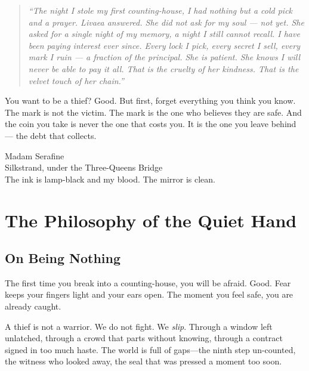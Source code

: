 \documentclass[10pt,twoside]{book}
\newenvironment{storybox}
  {\begin{quote}\itshape\small\setlength{\parskip}{0.5em}}
  {\end{quote}}
\begin{document}
\vspace{0.2cm}
\begin{storybox}
\small
\textit{``The night I stole my first counting-house, I had nothing but a cold pick and a prayer. Livaea answered. She did not ask for my soul --- not yet. She asked for a single night of my memory, a night I still cannot recall. I have been paying interest ever since. Every lock I pick, every secret I sell, every mark I ruin --- a fraction of the principal. She is patient. She knows I will never be able to pay it all. That is the cruelty of her kindness. That is the velvet touch of her chain.''}
\end{storybox}

You want to be a thief? Good. But first, forget everything you think you know. The mark is not the victim. The mark is the one who believes they are safe. And the coin you take is never the one that costs you. It is the one you leave behind --- the debt that collects.

\vspace{0.5cm}
\begin{flushright}
Madam Serafine\\
Silkstrand, under the Three-Queens Bridge\\
The ink is lamp-black and my blood. The mirror is clean.
\end{flushright}

\tableofcontents
\newpage

\part{The Philosophy of the Quiet Hand}


\chapter{On Being Nothing}

The first time you break into a counting-house, you will be afraid. Good. Fear keeps your fingers light and your ears open. The moment you feel safe, you are already caught.

A thief is not a warrior. We do not fight. We \emph{slip}. Through a window left unlatched, through a crowd that parts without knowing, through a contract signed in too much haste. The world is full of gaps---the ninth step un-counted, the witness who looked away, the seal that was pressed a moment too soon. 
\end{document}
